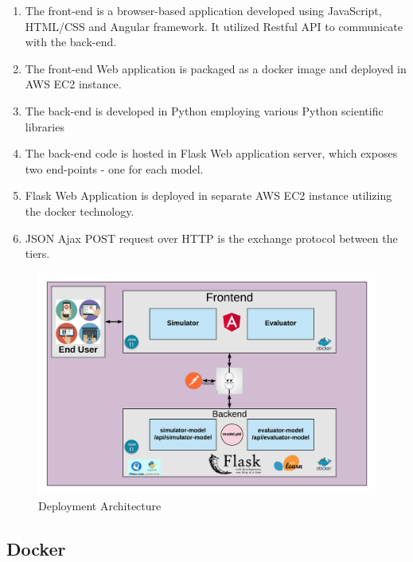 \begin{enumerate}
\def\labelenumi{\arabic{enumi}.}
\tightlist
\item
  The front-end is a browser-based application developed using
  JavaScript, HTML/CSS and Angular framework. It utilized Restful API to
  communicate with the back-end.
\item
  The front-end Web application is packaged as a docker image and
  deployed in AWS EC2 instance.
\item
  The back-end is developed in Python employing various Python
  scientific libraries
\item
  The back-end code is hosted in Flask Web application server, which
  exposes two end-points - one for each model.
\item
  Flask Web Application is deployed in separate AWS EC2 instance
  utilizing the docker technology.
\item
  JSON Ajax POST request over HTTP is the exchange protocol between the
  tiers.
\end{enumerate}

\begin{Schunk}
\begin{figure}[H]

{\centering \includegraphics[width=1.15\linewidth]{../../artifacts/architecture} 

}

\caption[Deployment Architecture]{Deployment Architecture}\label{fig:arch}
\end{figure}
\end{Schunk}

\hypertarget{docker}{%
\subsection{Docker}\label{docker}}

